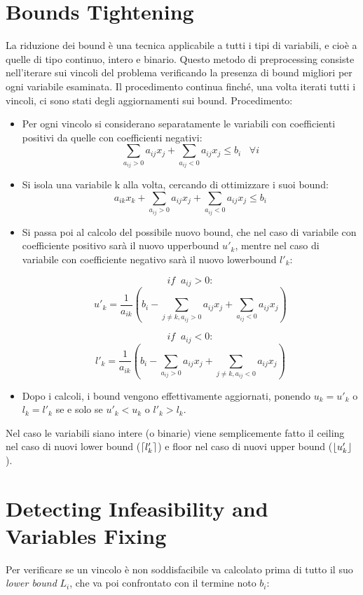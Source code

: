 \documentclass{article}
\DeclarePairedDelimiter{\ceil}{\lceil}{\rceil}
\DeclarePairedDelimiter\floor{\lfloor}{\rfloor}
\begin{document}
\section{Bounds Tightening}

La riduzione dei bound è una tecnica applicabile a tutti i tipi di variabili, e cioè a quelle di tipo continuo, intero e binario.
\newline
\newline
Questo metodo di preprocessing consiste nell'iterare sui vincoli del problema verificando la presenza di bound migliori per ogni variabile esaminata. Il procedimento continua finché, una volta iterati tutti i vincoli, ci sono stati degli aggiornamenti sui bound.
\newline
\newline
Procedimento:
\begin{itemize}
\item Per ogni vincolo si considerano separatamente le variabili con coefficienti positivi da quelle con coefficienti negativi:
\[
\sum_{a_{ij}>0}a_{ij} x_{j} + \sum_{a_{ij}<0}a_{ij} x_{j} \le b_i  \;\;\;\forall i
\] 
\item Si isola una variabile k alla volta, cercando di ottimizzare i suoi bound:
\[
a_{ik} x_{k} + \sum_{a_{ij}>0}a_{ij} x_{j} + \sum_{a_{ij}<0}a_{ij} x_{j} \le b_i
\]
\item Si passa poi al calcolo del possibile nuovo bound, che nel caso di variabile con coefficiente positivo sarà il nuovo upperbound $u'_k$, mentre nel caso di variabile con coefficiente negativo sarà il nuovo lowerbound $l'_k$:

\[
if\;\;a_{ij}>0:\]
\[
u'_k = \frac{1}{a_{ik}}\left(b_i - \sum_{j\ne k,a_{ij}>0}a_{ij} x_{j} + \sum_{a_{ij}<0}a_{ij} x_{j}\right)
\]

\[
if\;\;a_{ij}<0:\]
\[
l'_k = \frac{1}{a_{ik}}\left(b_i - \sum_{a_{ij}>0}a_{ij} x_{j} + \sum_{j\ne k,a_{ij}<0}a_{ij} x_{j}\right)
\]
\item Dopo i calcoli, i bound vengono effettivamente aggiornati, ponendo $u_k = u'_k$ o $l_k=l'_k$ se e solo se $u'_k<u_k$ o $l'_k>l_k$.
\end{itemize}

Nel caso le variabili siano intere (o binarie) viene semplicemente fatto il ceiling nel caso di nuovi lower bound ($\ceil*{l'_k}$) e floor nel caso di nuovi upper bound ($\floor*{u'_k}$).
\section{Detecting Infeasibility and Variables Fixing}
Per verificare se un vincolo è non soddisfacibile va calcolato prima di tutto il suo \textit{lower bound} $L_i$, che va poi confrontato con il termine noto $b_i$:
\end{document}
